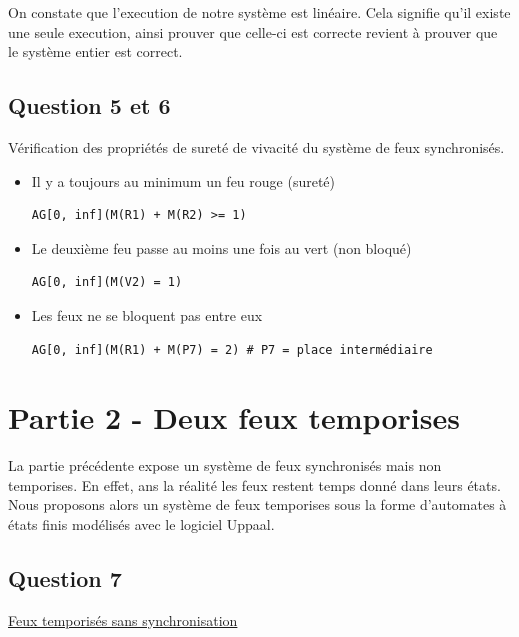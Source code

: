 \documentclass[11pt]{article}
\begin{document}
On constate que l'execution de notre système est linéaire. Cela signifie qu'il existe une seule execution, ainsi prouver que celle-ci est correcte revient à prouver que le système entier est correct.

\subsection{Question 5 et 6}

Vérification des propriétés de sureté de vivacité du système de feux synchronisés.

\begin{itemize}
	\item Il y a toujours au minimum un feu rouge (sureté)
\begin{verbatim}
AG[0, inf](M(R1) + M(R2) >= 1)	
\end{verbatim}

	\item Le deuxième feu passe au moins une fois au vert (non bloqué)
\begin{verbatim}
AG[0, inf](M(V2) = 1)	
\end{verbatim}

	\item Les feux ne se bloquent pas entre eux
\begin{verbatim}
AG[0, inf](M(R1) + M(P7) = 2) # P7 = place intermédiaire	
\end{verbatim}
\end{itemize}

\section{Partie 2 - Deux feux temporises}
La partie précédente expose un système de feux synchronisés mais non temporises. En effet, ans la réalité les feux restent temps donné dans leurs états. Nous proposons alors un système de feux temporises sous la forme d'automates à états finis modélisés avec le logiciel Uppaal.

\subsection{Question 7}

\href{https://github.com/masters-info-nantes/hong-cheng-lv/blob/master/ressources/part2/Q7-FeuxTemporises.xml}{Feux temporisés sans synchronisation}
\end{document}
